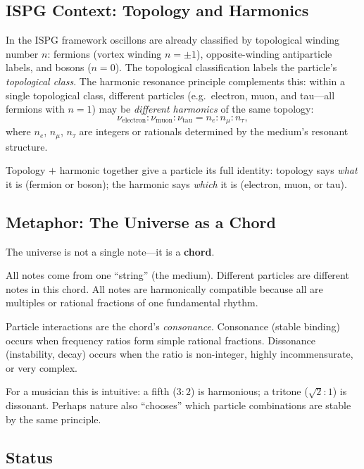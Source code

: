 \documentclass[11pt]{article}
\begin{document}
\subsection{ISPG Context: Topology and Harmonics}

In the ISPG framework oscillons are already classified by
topological winding number $n$: fermions (vortex winding
$n = \pm 1$), opposite-winding antiparticle labels, and
bosons ($n = 0$).  The topological classification labels the
particle's \emph{topological class}. The harmonic resonance
principle complements this:
within a single topological class, different particles (e.g.\
electron, muon, and tau---all fermions with $n = 1$) may be
\emph{different harmonics} of the same topology:
\begin{equation}
  \nu_{\mathrm{electron}} : \nu_{\mathrm{muon}}
  : \nu_{\mathrm{tau}}
  = n_e : n_\mu : n_\tau,
  \label{eq:lepton_harmonics}
\end{equation}
where $n_e$, $n_\mu$, $n_\tau$ are integers or rationals determined
by the medium's resonant structure.

Topology $+$ harmonic together give a particle its full identity:
topology says \emph{what} it is (fermion or boson); the harmonic
says \emph{which} it is (electron, muon, or tau).

\subsection{Metaphor: The Universe as a Chord}

The universe is not a single note---it is a \textbf{chord}.

All notes come from one ``string'' (the medium). Different
particles are different notes in this chord. All notes are
harmonically compatible because all are multiples or rational
fractions of one fundamental rhythm.

Particle interactions are the chord's \emph{consonance}. Consonance
(stable binding) occurs when frequency ratios form simple rational
fractions. Dissonance (instability, decay) occurs when the ratio is
non-integer, highly incommensurate, or very complex.

For a musician this is intuitive: a fifth ($3{:}2$) is harmonious;
a tritone ($\sqrt{2}{:}1$) is dissonant. Perhaps nature also
``chooses'' which particle combinations are stable by the same
principle.

\subsection{Status}
\end{document}
